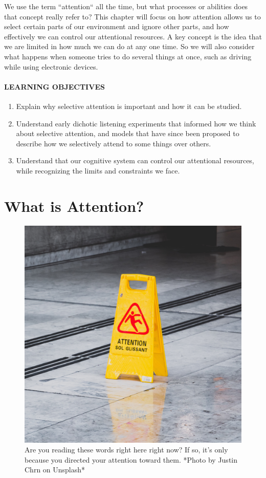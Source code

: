 \documentclass[
]{krantz}
\providecommand{\tightlist}{%
  \setlength{\itemsep}{0pt}\setlength{\parskip}{0pt}}
\begin{document}
We use the term ``attention`` all the time, but what processes or abilities does that concept really refer to? This chapter will focus on how attention allows us to select certain parts of our environment and ignore other parts, and how effectively we can control our attentional resources. A key concept is the idea that we are limited in how much we can do at any one time. So we will also consider what happens when someone tries to do several things at once, such as driving while using electronic devices.

\hypertarget{learning-objectives-2}{%
\paragraph*{LEARNING OBJECTIVES}\label{learning-objectives-2}}

\begin{enumerate}
\def\labelenumi{\arabic{enumi}.}
\tightlist
\item
  Explain why selective attention is important and how it can be studied.
\item
  Understand early dichotic listening experiments that informed how we think about selective attention, and models that have since been proposed to describe how we selectively attend to some things over others.
\item
  Understand that our cognitive system can control our attentional resources, while recognizing the limits and constraints we face.
\end{enumerate}

\hypertarget{what-is-attention}{%
\section{What is Attention?}\label{what-is-attention}}

\begin{figure}

{\centering \includegraphics[width=0.5\linewidth]{images/3_attention/attentionsign} 

}

\caption{Are you reading these words right here right now? If so, it’s only because you directed your attention toward them. *Photo by Justin Chrn on Unsplash*}\label{fig:attentionsign}
\end{figure}
\end{document}
